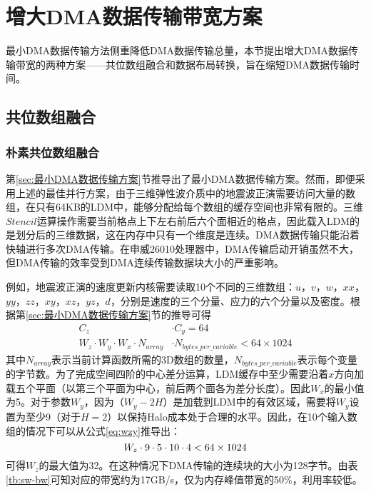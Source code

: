 \section{增大DMA数据传输带宽方案} %

最小DMA数据传输方法侧重降低DMA数据传输总量，本节提出增大DMA数据传输带宽的两种方案——共位数组融合和数据布局转换，旨在缩短DMA数据传输时间。

\subsection{共位数组融合}
\subsubsection{朴素共位数组融合}

第\ref{sec:最小DMA数据传输方案}节推导出了最小DMA数据传输方案。然而，即便采用上述的最佳并行方案，由于三维弹性波介质中的地震波正演需要访问大量的数组，在只有64KB的LDM中，能够分配给每个数组的缓存空间也非常有限的。三维$Stencil$运算操作需要当前格点上下左右前后六个面相近的格点，因此载入LDM的是划分后的三维数据，这在内存中只有一个维度是连续。DMA数据传输只能沿着快轴进行多次DMA传输。在申威26010处理器中，DMA传输启动开销虽然不大，但DMA传输的效率受到DMA连续传输数据块大小的严重影响。

例如，地震波正演的速度更新内核需要读取10个不同的三维数组：$ u $，$ v $，$ w $，$ xx $，$ yy $，$ zz $，$ xy $，$ xz $，$ yz $，$ d $，分别是速度的三个分量、应力的六个分量以及密度。根据第\ref{sec:最小DMA数据传输方案}节的推导可得
\begin{equation}
\begin{aligned}
C_z &\cdot C_y = 64  \\
W_z \cdot W_y \cdot W_x \cdot N_{array} &\cdot N_{bytes\_per\_variable} < 64 \times 1024
\end{aligned}
\label{eq:wzy}
\end{equation}
其中$ N_{array} $表示当前计算函数所需的3D数组的数量，$N_{bytes\_per\_variable}$表示每个变量的字节数。为了完成空间四阶的中心差分运算，LDM缓存中至少需要沿着$x$方向加载五个平面（以第三个平面为中心，前后两个面各为差分长度）。因此$ W_x $的最小值为5。对于参数$ W_y $，因为$（W_y-2H）$是加载到LDM中的有效区域，需要将$ W_y $设置为至少9（对于$ H = 2 $）以保持Halo成本处于合理的水平。因此，在10个输入数组的情况下可以从公式\ref{eq:wzy}推导出：
\begin{equation}
W_z \cdot 9 \cdot 5 \cdot 10 \cdot 4 < 64 \times 1024\\
\label{eq:wzy1}
\end{equation}
可得$ W_z $的最大值为32。在这种情况下DMA传输的连续块的大小为128字节。由表\ref{tb:sw-bw}可知对应的带宽约为17GB/s，仅为内存峰值带宽的50\%，利用率较低。

